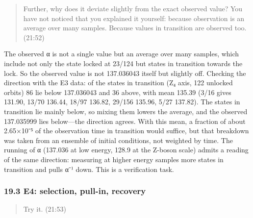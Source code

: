 \documentclass[
  a4paper,
]{article}
\begin{document}
\begin{quote}
Further, why does it deviate slightly from the exact observed value? You
have not noticed that you explained it yourself: because observation is
an average over many samples. Because values in transition are observed
too. (21:52)
\end{quote}

The observed α is not a single value but an average over many samples,
which include not only the state locked at 23/124 but states in
transition towards the lock. So the observed value is not 137.036043
itself but slightly off. Checking the direction with the E3 data: of the
states in transition (Z₄ axis, 122 unlocked orbits) 86 lie below
137.036043 and 36 above, with mean 135.39 (3/16 gives 131.90, 13/70
136.44, 18/97 136.82, 29/156 135.96, 5/27 137.82). The states in
transition lie mainly below, so mixing them lowers the average, and the
observed 137.035999 lies below---the direction agrees. With this mean, a
fraction of about 2.65×10⁻⁵ of the observation time in transition would
suffice, but that breakdown was taken from an ensemble of initial
conditions, not weighted by time. The running of α (137.036 at low
energy, 128.9 at the Z-boson scale) admits a reading of the same
direction: measuring at higher energy samples more states in transition
and pulls α⁻¹ down. This is a verification task.

\subsubsection{19.3 E4: selection, pull-in,
recovery}\label{e4-selection-pull-in-recovery}

\begin{quote}
Try it. (21:53)
\end{quote}
\end{document}
